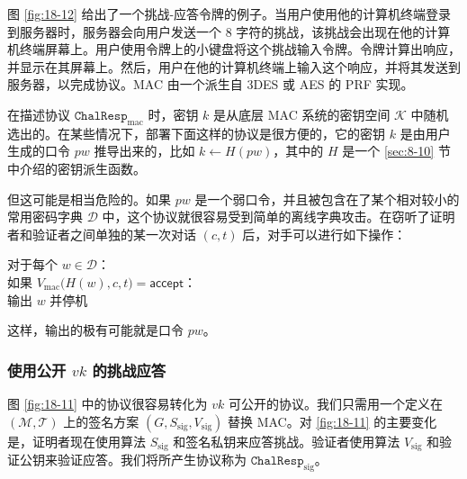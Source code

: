 \begin{snote}
图 \ref{fig:18-12} 给出了一个挑战-应答令牌的例子。当用户使用他的计算机终端登录到服务器时，服务器会向用户发送一个 $8$ 字符的挑战，该挑战会出现在他的计算机终端屏幕上。用户使用令牌上的小键盘将这个挑战输入令牌。令牌计算出响应，并显示在其屏幕上。然后，用户在他的计算机终端上输入这个响应，并将其发送到服务器，以完成协议。MAC 由一个派生自 3DES 或 AES 的 PRF 实现。
\end{snote}

\begin{snote}[使用口令的挑战-应答。]
在描述协议 $\mathtt{ChalResp}_\mathrm{mac}$ 时，密钥 $k$ 是从底层 MAC 系统的密钥空间 $\mathcal{K}$ 中随机选出的。在某些情况下，部署下面这样的协议是很方便的，它的密钥 $k$ 是由用户生成的口令 $pw$ 推导出来的，比如 $k\leftarrow H(pw)$，其中的 $H$ 是一个 \ref{sec:8-10} 节中介绍的密钥派生函数。

但这可能是相当危险的。如果 $pw$ 是一个弱口令，并且被包含在了某个相对较小的常用密码字典 $\mathcal{D}$ 中，这个协议就很容易受到简单的离线字典攻击。在窃听了证明者和验证者之间单独的某一次对话 $(c,t)$ 后，对手可以进行如下操作：

\vspace*{10pt}

\hspace*{5pt} 对于每个 $w\in\mathcal{D}$：\\
\hspace*{50pt} 如果 $V_\mathrm{mac}\big(H(w),c,t\big)= \mathsf{accept}$：\\
\hspace*{75pt} 输出 $w$ 并停机

\vspace*{10pt}

\noindent
这样，输出的极有可能就是口令 $pw$。
\end{snote}

\subsubsection{使用公开 $vk$ 的挑战应答}\label{subsubsec:18-6-1-1}

图 \ref{fig:18-11} 中的协议很容易转化为 $vk$ 可公开的协议。我们只需用一个定义在 $(\mathcal{M},\mathcal{T})$ 上的签名方案 $(G,S_\mathrm{sig},V_\mathrm{sig})$ 替换 MAC。对 \ref{fig:18-11} 的主要变化是，证明者现在使用算法 $S_\mathrm{sig}$ 和签名私钥来应答挑战。验证者使用算法 $V_\mathrm{sig}$ 和验证公钥来验证应答。我们将所产生协议称为 $\mathtt{ChalResp}_\mathrm{sig}$。

